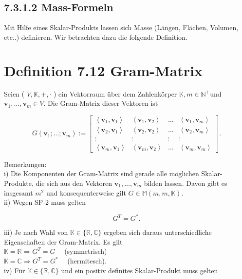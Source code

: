 \documentclass[10pt]{article}
\begin{document}
\subsection*{7.3.1.2 Mass-Formeln}
Mit Hilfe eines Skalar-Produkts lassen sich Masse (Längen, Flächen, Volumen, etc..) definieren. Wir betrachten dazu die folgende Definition.

\section*{Definition 7.12 Gram-Matrix}
Seien ( $V, \mathbb{K},+, \cdot$ ) ein Vektorraum über dem Zahlenkörper $\mathbb{K}, m \in \mathbb{N}^{+}$und $\mathbf{v}_{1}, \ldots, \mathbf{v}_{m} \in V$. Die Gram-Matrix dieser Vektoren ist

\[
G\left(\mathbf{v}_{1} ; \ldots ; \mathbf{v}_{m}\right):=\left[\begin{array}{cccc}
\left\langle\mathbf{v}_{1}, \mathbf{v}_{1}\right\rangle & \left\langle\mathbf{v}_{1}, \mathbf{v}_{2}\right\rangle & \ldots & \left\langle\mathbf{v}_{1}, \mathbf{v}_{m}\right\rangle  \tag{7.65}\\
\left\langle\mathbf{v}_{2}, \mathbf{v}_{1}\right\rangle & \left\langle\mathbf{v}_{2}, \mathbf{v}_{2}\right\rangle & \ldots & \left\langle\mathbf{v}_{2}, \mathbf{v}_{m}\right\rangle \\
\vdots & \vdots & \vdots & \vdots \\
\left\langle\mathbf{v}_{m}, \mathbf{v}_{1}\right\rangle & \left\langle\mathbf{v}_{m}, \mathbf{v}_{2}\right\rangle & \ldots & \left\langle\mathbf{v}_{m}, \mathbf{v}_{m}\right\rangle
\end{array}\right] .
\]

Bemerkungen:\\
i) Die Komponenten der Gram-Matrix sind gerade alle möglichen Skalar-Produkte, die sich aus den Vektoren $\mathbf{v}_{1}, \ldots, \mathbf{v}_{m}$ bilden lassen. Davon gibt es insgesamt $m^{2}$ und konsequenterweise gilt $G \in \mathbb{M}(m, m, \mathbb{K})$.\\
ii) Wegen SP-2 muss gelten


\begin{equation*}
G^{T}=G^{*} . \tag{7.66}
\end{equation*}


iii) Je nach Wahl von $\mathbb{K} \in\{\mathbb{R}, \mathbb{C}\}$ ergeben sich daraus unterschiedliche Eigenschaften der Gram-Matrix. Es gilt\\
$\mathbb{K}=\mathbb{R} \Rightarrow G^{T}=G \quad$ (symmetrisch)\\
$\mathbb{K}=\mathbb{C} \Rightarrow G^{T}=G^{*} \quad$ (hermitesch).\\
iv) Für $\mathbb{K} \in\{\mathbb{R}, \mathbb{C}\}$ und ein positiv definites Skalar-Produkt muss gelten
\end{document}
